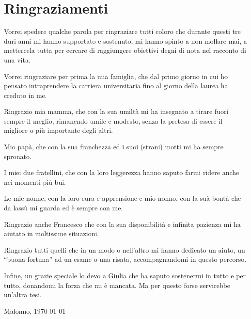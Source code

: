\documentclass[12pt,a4paper,openright]{book}  %
\begin{document}
\chapter{Ringraziamenti}
\resetsecnumdepth

Vorrei spedere qualche parola per ringraziare tutti coloro che durante
questi tre duri anni mi hanno supportato e sostenuto, mi hanno spinto
a non mollare mai, a mettercela tutta per cercare di raggiungere
obiettivi degni di nota nel racconto di una vita.

\bigskip

Vorrei ringraziare per prima la mia famiglia, che dal primo giorno in
cui ho pensato intraprendere la carriera universitaria fino al giorno
della laurea ha creduto in me.

Ringrazio mia mamma, che con la sua umiltà mi ha insegnato a tirare
fuori sempre il meglio, rimanendo umile e modesto, senza la pretesa di
essere il migliore o più importante degli altri.

Mio papà, che con la sua franchezza ed i suoi (strani) motti mi ha
sempre spronato.

I miei due fratellini, che con la loro leggerezza hanno saputo farmi
ridere anche nei momenti più bui.

Le mie nonne, con la loro cura e apprensione e mio nonno, con la suà
bontà che da lassù mi guarda ed è sempre con me.

\bigskip

Ringrazio anche Francesco che con la sua disponibilità e infinita
pazienza mi ha aiutato in moltissime situazioni.

\bigskip

Ringrazio tutti quelli che in un modo o nell'altro mi hanno dedicato
un aiuto, un ``buona fortuna'' ad un esame o una risata,
accompagnandomi in questo percorso.

\bigskip

Infine, un grazie speciale lo devo a Giulia che ha saputo sostenermi
in tutto e per tutto, donandomi la forza che mi è mancata. Ma per
questo forse servirebbe un'altra tesi.

\bigskip
\bigskip

\begin{flushright}
	Malonno, \today
\end{flushright}






\printbibliography
{}
\end{document}
